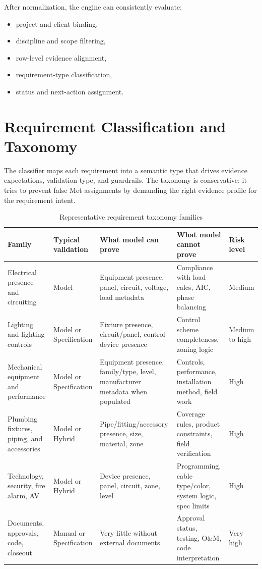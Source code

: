 \documentclass[10pt,letterpaper]{article}
\begin{document}
After normalization, the engine can consistently evaluate:

\begin{itemize}
  \item project and client binding,
  \item discipline and scope filtering,
  \item row-level evidence alignment,
  \item requirement-type classification,
  \item status and next-action assignment.
\end{itemize}

\section{Requirement Classification and Taxonomy}

The classifier maps each requirement into a semantic type that drives evidence expectations, validation type, and guardrails. The taxonomy is conservative: it tries to prevent false Met assignments by demanding the right evidence profile for the requirement intent.

\begin{longtable}{p{1.15in}p{1.0in}p{1.45in}p{1.45in}p{1.0in}}
\caption{Representative requirement taxonomy families}\\
\toprule
\textbf{Family} & \textbf{Typical validation} & \textbf{What model can prove} & \textbf{What model cannot prove} & \textbf{Risk level} \\
\midrule
\endhead
Electrical presence and circuiting & Model & Equipment presence, panel, circuit, voltage, load metadata & Compliance with load calcs, AIC, phase balancing & Medium \\
Lighting and lighting controls & Model or Specification & Fixture presence, circuit/panel, control device presence & Control scheme completeness, zoning logic & Medium to high \\
Mechanical equipment and performance & Model or Specification & Equipment presence, family/type, level, manufacturer metadata when populated & Controls, performance, installation method, field work & High \\
Plumbing fixtures, piping, and accessories & Model or Hybrid & Pipe/fitting/accessory presence, size, material, zone & Coverage rules, product constraints, field verification & High \\
Technology, security, fire alarm, AV & Model or Hybrid & Device presence, panel, circuit, zone, level & Programming, cable type/color, system logic, spec limits & High \\
Documents, approvals, code, closeout & Manual or Specification & Very little without external documents & Approval status, testing, O\&M, code interpretation & Very high \\
\bottomrule
\end{longtable}
\end{document}
